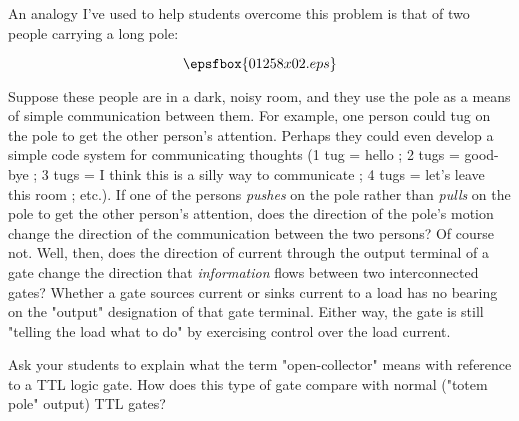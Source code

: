 An analogy I've used to help students overcome this problem is that of two people carrying a long pole:

$$\epsfbox{01258x02.eps}$$

Suppose these people are in a dark, noisy room, and they use the pole as a means of simple communication between them.  For example, one person could tug on the pole to get the other person's attention.  Perhaps they could even develop a simple code system for communicating thoughts (1 tug = hello ; 2 tugs = good-bye ; 3 tugs = I think this is a silly way to communicate ; 4 tugs = let's leave this room ; etc.).  If one of the persons {\it pushes} on the pole rather than {\it pulls} on the pole to get the other person's attention, does the direction of the pole's motion change the direction of the communication between the two persons?  Of course not.  Well, then, does the direction of current through the output terminal of a gate change the direction that {\it information} flows between two interconnected gates?  Whether a gate sources current or sinks current to a load has no bearing on the "output" designation of that gate terminal.  Either way, the gate is still "telling the load what to do" by exercising control over the load current.

\vskip 10pt

Ask your students to explain what the term "open-collector" means with reference to a TTL logic gate.  How does this type of gate compare with normal ("totem pole" output) TTL gates?




